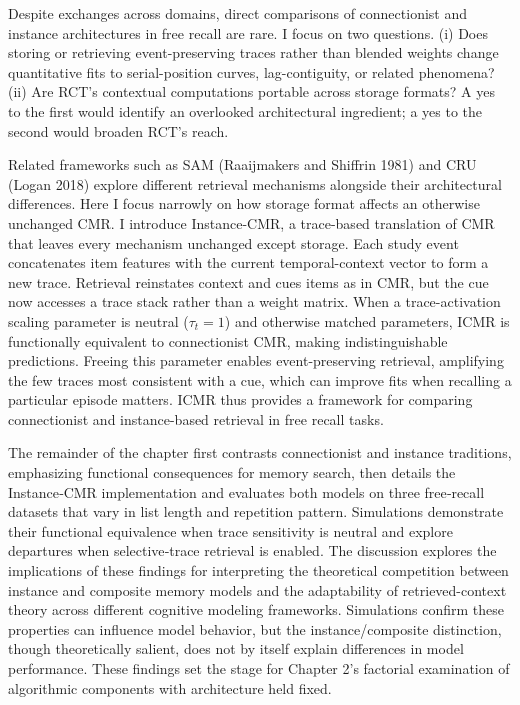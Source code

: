 \documentclass[
  letterpaper,
  11pt,
  english,
  singlespacing,
  headsepline]{MastersDoctoralThesis}
\begin{document}
Despite exchanges across domains, direct comparisons of connectionist
and instance architectures in free recall are rare. I focus on two
questions. (i) Does storing or retrieving event-preserving traces rather
than blended weights change quantitative fits to serial-position curves,
lag-contiguity, or related phenomena? (ii) Are RCT's contextual
computations portable across storage formats? A yes to the first would
identify an overlooked architectural ingredient; a yes to the second
would broaden RCT's reach.

Related frameworks such as SAM (Raaijmakers and Shiffrin 1981) and CRU
(Logan 2018) explore different retrieval mechanisms alongside their
architectural differences. Here I focus narrowly on how storage format
affects an otherwise unchanged CMR. I introduce Instance-CMR, a
trace-based translation of CMR that leaves every mechanism unchanged
except storage. Each study event concatenates item features with the
current temporal-context vector to form a new trace. Retrieval
reinstates context and cues items as in CMR, but the cue now accesses a
trace stack rather than a weight matrix. When a trace-activation scaling
parameter is neutral (\(\tau_t = 1\)) and otherwise matched parameters,
ICMR is functionally equivalent to connectionist CMR, making
indistinguishable predictions. Freeing this parameter enables
event-preserving retrieval, amplifying the few traces most consistent
with a cue, which can improve fits when recalling a particular episode
matters. ICMR thus provides a framework for comparing connectionist and
instance-based retrieval in free recall tasks.

The remainder of the chapter first contrasts connectionist and instance
traditions, emphasizing functional consequences for memory search, then
details the Instance‑CMR implementation and evaluates both models on
three free‑recall datasets that vary in list length and repetition
pattern. Simulations demonstrate their functional equivalence when trace
sensitivity is neutral and explore departures when selective‑trace
retrieval is enabled. The discussion explores the implications of these
findings for interpreting the theoretical competition between instance
and composite memory models and the adaptability of retrieved-context
theory across different cognitive modeling frameworks. Simulations
confirm these properties can influence model behavior, but the
instance/composite distinction, though theoretically salient, does not
by itself explain differences in model performance. These findings set
the stage for Chapter 2's factorial examination of algorithmic
components with architecture held fixed.
\end{document}

